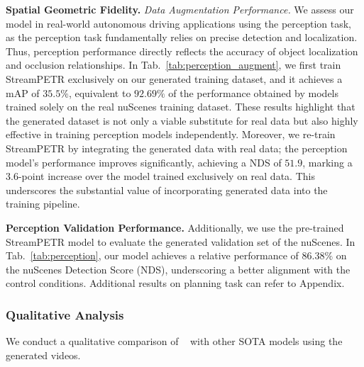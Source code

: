 \noindent\textbf{Spatial Geometric Fidelity.} 
\noindent \textit{Data Augmentation Performance.} 
We assess our model in real-world autonomous driving applications using the perception task, 
as the perception task fundamentally relies on precise detection and localization. Thus, perception performance directly reflects the accuracy of object localization and occlusion relationships. 
In Tab.~\ref{tab:perception_augment}, 
we first train StreamPETR exclusively on our generated training dataset, and it achieves a mAP of $35.5\%$, equivalent to $92.69\%$ of the performance obtained by models trained solely on the real nuScenes training dataset. 
These results highlight that the generated dataset is not only a viable substitute for real data but also highly effective in training perception models independently.
Moreover, we re-train StreamPETR by integrating the generated data with real data; the perception model's performance improves significantly, achieving a NDS of $51.9$, marking a $3.6$-point increase over the model trained exclusively on real data. This underscores the substantial value of incorporating generated data into the training pipeline.




\noindent \textbf{Perception Validation Performance.}  
Additionally, we use the pre-trained StreamPETR model to evaluate the generated validation set of the nuScenes.
In Tab.~\ref{tab:perception}, our model achieves a relative performance of $86.38\%$ on the nuScenes Detection Score (NDS), underscoring a better alignment with the control conditions. Additional results on planning task can refer to Appendix.

\subsubsection{Qualitative Analysis}
We conduct a qualitative comparison of \titleDef~ with other SOTA models using the generated videos.

